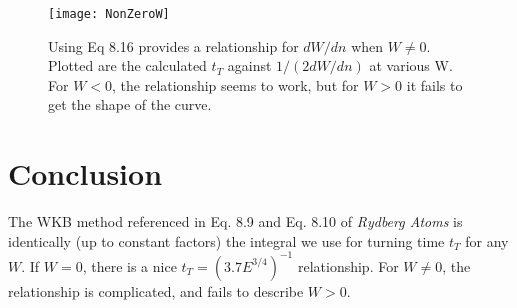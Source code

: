\documentclass[aps,pra,preprint,groupedaddress]{revtex4-1}
\begin{document}
\begin{figure}
\texttt{[image: NonZeroW]}
\caption{\label{fig:nzw} Using Eq 8.16 provides a relationship for $dW/dn$ when $W \neq 0$. Plotted are the calculated $t_T$ against $1/(2 dW/dn)$ at various W. For $W < 0$, the relationship seems to work, but for $W > 0$ it fails to get the shape of the curve.}
\end{figure}


\section{\label{sec:conc} Conclusion}

The WKB method referenced in Eq. 8.9 and Eq. 8.10 of \emph{Rydberg Atoms} is identically (up to constant factors) the integral we use for turning time $t_T$ for any $W$. If $W = 0$, there is a nice $t_T = (3.7 E^{3/4})^{-1}$ relationship. For $W \neq 0$, the relationship is complicated, and fails to describe $W > 0$.
\end{document}
